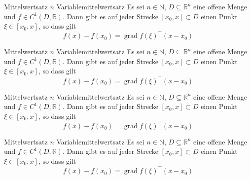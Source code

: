 \begin{tcbtheorem}{Mittelwertsatz $n$ Variable}{mittelwertsatz}
    Es sei $n\in\mathbb{N}$, $D\subseteq\mathbb{R}^n$ eine offene Menge und $f\in C^{1}(D,\mathbb{R})$. Dann gibt es auf jeder Strecke $[x_0,x]\subset D$ einen Punkt $\xi\in[x_0,x]$, so dass gilt
    \begin{equation*}
        f(x)-f(x_0) = \operatorname{grad} f(\xi)^{\top}(x-x_0)
    \end{equation*}
\end{tcbtheorem}
\begin{tcbcorollary}{Mittelwertsatz $n$ Variable}{mittelwertsatz}
    Es sei $n\in\mathbb{N}$, $D\subseteq\mathbb{R}^n$ eine offene Menge und $f\in C^{1}(D,\mathbb{R})$. Dann gibt es auf jeder Strecke $[x_0,x]\subset D$ einen Punkt $\xi\in[x_0,x]$, so dass gilt
    \begin{equation*}
        f(x)-f(x_0) = \operatorname{grad} f(\xi)^{\top}(x-x_0)
    \end{equation*}
\end{tcbcorollary}
\begin{tcbdefinition}{Mittelwertsatz $n$ Variable}{mittelwertsatz}
    Es sei $n\in\mathbb{N}$, $D\subseteq\mathbb{R}^n$ eine offene Menge und $f\in C^{1}(D,\mathbb{R})$. Dann gibt es auf jeder Strecke $[x_0,x]\subset D$ einen Punkt $\xi\in[x_0,x]$, so dass gilt
    \begin{equation*}
        f(x)-f(x_0) = \operatorname{grad} f(\xi)^{\top}(x-x_0)
    \end{equation*}
\end{tcbdefinition}
\begin{tcblemma}{Mittelwertsatz $n$ Variable}{mittelwertsatz}
    Es sei $n\in\mathbb{N}$, $D\subseteq\mathbb{R}^n$ eine offene Menge und $f\in C^{1}(D,\mathbb{R})$. Dann gibt es auf jeder Strecke $[x_0,x]\subset D$ einen Punkt $\xi\in[x_0,x]$, so dass gilt
    \begin{equation*}
        f(x)-f(x_0) = \operatorname{grad} f(\xi)^{\top}(x-x_0)
    \end{equation*}
\end{tcblemma}
